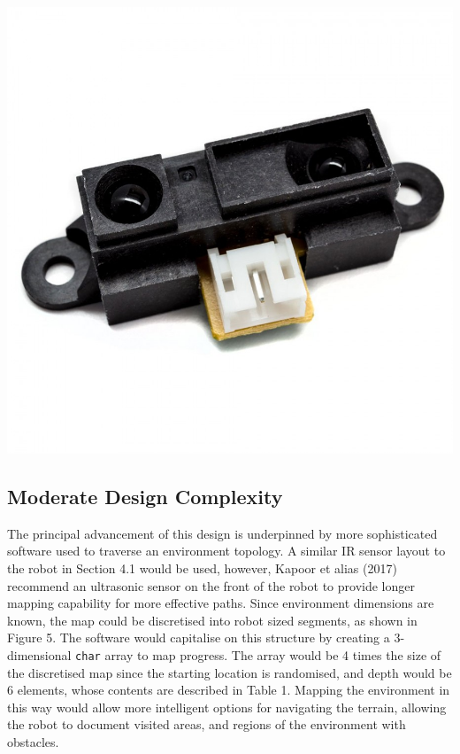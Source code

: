 \documentclass[a4paper]{article}
\begin{document}
\begin{center}
\includegraphics[scale=0.1]{sensor_1_2}
\end{center}


\newpage

\subsection{Moderate Design Complexity}
The principal advancement of this design is underpinned by more sophisticated software used to traverse an environment topology. A similar IR sensor layout to the robot in Section 4.1 would be used, however, Kapoor et alias (2017) recommend an ultrasonic sensor on the front of the robot to provide longer mapping capability for more effective paths. Since environment dimensions are known, the map could be discretised into robot sized segments, as shown in Figure 5. The software would capitalise on this structure by creating a 3-dimensional \verb|char| array to map progress. The array would be 4 times the size of the discretised map since the starting location is randomised, and depth would be 6 elements, whose contents are described in Table 1. Mapping the environment in this way would allow more intelligent options for navigating the terrain, allowing the robot to document visited areas, and regions of the environment with obstacles.
\end{document}
